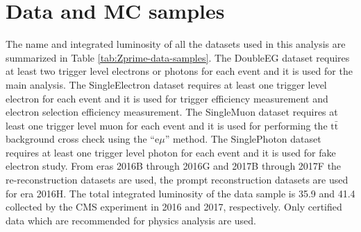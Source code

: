 \section{Data and MC samples}\label{sec:Zprime_data_mc}
The name and integrated luminosity of all the datasets used in this analysis are summarized in Table \ref{tab:Zprime-data-samples}. The DoubleEG dataset requires at least two trigger level electrons or photons for each event and it is used for the main analysis. The SingleElectron dataset requires at least one trigger level electron for each event and it is used for trigger efficiency measurement and electron selection efficiency measurement. The SingleMuon dataset requires at least one trigger level muon for each event and it is used for performing the $\mathrm{t\bar{t}}$ background cross check using the ``$\mathrm{e}\mu$'' method. The SinglePhoton dataset requires at least one trigger level photon for each event and it is used for fake electron study. From eras 2016B through 2016G and 2017B through 2017F the re-reconstruction datasets are used, the prompt reconstruction datasets are used for era 2016H. The total integrated luminosity of the data sample is 35.9 \fbinv and 41.4 \fbinv collected by the CMS experiment in 2016 and 2017, respectively. Only certified data which are recommended for physics analysis are used.
